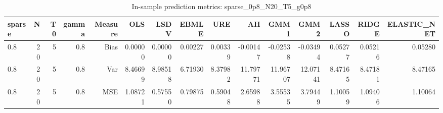 \begin{table}[!htbp]\centering
\caption{In-sample prediction metrics: sparse_0p8_N20_T5_g0p8}
\label{tab:table2_sparse_0p8_N20_T5_g0p8}
\begin{tabular}{lrrrrrrrrrrrrrr}
\hline
sparse & N & T0 & gamma & Measure & OLS & LSDV & EBMLE & URE & AH & GMM1 & GMM2 & LASSO & RIDGE & ELASTIC_NET \\
\hline
0.8 & 20 & 5 & 0.8 & Bias & 0.00000 & 0.00000 & 0.00227 & 0.00339 & -0.00147 & -0.02538 & -0.03494 & 0.05277 & 0.05216 & 0.05280 \\
0.8 & 20 & 5 & 0.8 & Var & 8.46699 & 8.98518 & 6.71930 & 8.37982 & 11.79771 & 11.96707 & 12.07141 & 8.47165 & 8.47181 & 8.47165 \\
0.8 & 20 & 5 & 0.8 & MSE & 1.08721 & 0.57550 & 0.79875 & 0.59048 & 2.65988 & 3.55535 & 3.79449 & 1.10059 & 1.09406 & 1.10064 \\
\hline
\end{tabular}
\end{table}

